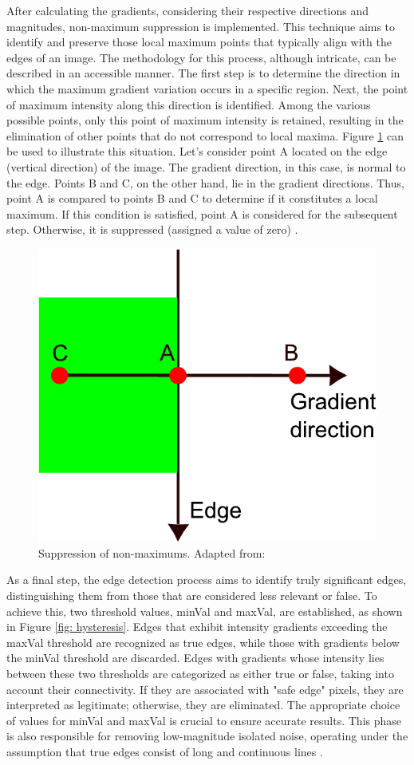 After calculating the gradients, considering their respective directions and magnitudes, non-maximum suppression is implemented. This technique aims to identify and preserve those local maximum points that typically align with the edges of an image. The methodology for this process, although intricate, can be described in an accessible manner. The first step is to determine the direction in which the maximum gradient variation occurs in a specific region. Next, the point of maximum intensity along this direction is identified. Among the various possible points, only this point of maximum intensity is retained, resulting in the elimination of other points that do not correspond to local maxima. Figure \ref{fig: suppression} can be used to illustrate this situation. Let's consider point A located on the edge (vertical direction) of the image. The gradient direction, in this case, is normal to the edge. Points B and C, on the other hand, lie in the gradient directions. Thus, point A is compared to points B and C to determine if it constitutes a local maximum. If this condition is satisfied, point A is considered for the subsequent step. Otherwise, it is suppressed (assigned a value of zero) \cite{canny_opencv_nodate}.

\begin{figure}[ht!]
\centering
\includegraphics[width=.65\linewidth]{images/Development/chap3/opencv.pdf}
\caption{Suppression of non-maximums. Adapted from: \cite{canny_opencv_nodate}}
\label{fig: suppression}
\end{figure}
As a final step, the edge detection process aims to identify truly significant edges, distinguishing them from those that are considered less relevant or false. To achieve this, two threshold values, minVal and maxVal, are established, as shown in Figure \ref{fig: hysteresis}. Edges that exhibit intensity gradients exceeding the maxVal threshold are recognized as true edges, while those with gradients below the minVal threshold are discarded. Edges with gradients whose intensity lies between these two thresholds are categorized as either true or false, taking into account their connectivity. If they are associated with "safe edge" pixels, they are interpreted as legitimate; otherwise, they are eliminated. The appropriate choice of values for minVal and maxVal is crucial to ensure accurate results. This phase is also responsible for removing low-magnitude isolated noise, operating under the assumption that true edges consist of long and continuous lines \cite{canny_opencv_nodate}.

